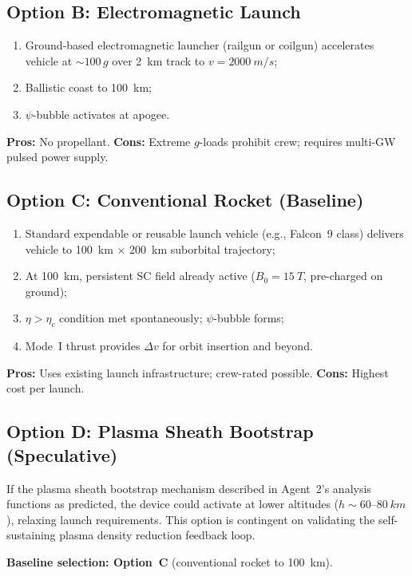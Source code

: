 \documentclass[11pt,a4paper]{article}
\begin{document}
\subsection{Option B: Electromagnetic Launch}

\begin{enumerate}[nosep]
\item Ground-based electromagnetic launcher (railgun or coilgun) accelerates
vehicle at $\sim\!100\,g$ over \SI{2}{km} track to $v = \SI{2000}{m/s}$;
\item Ballistic coast to \SI{100}{km};
\item $\psi$-bubble activates at apogee.
\end{enumerate}
\textbf{Pros:} No propellant. \textbf{Cons:} Extreme $g$-loads prohibit
crew; requires multi-GW pulsed power supply.

\subsection{Option C: Conventional Rocket (Baseline)}

\begin{enumerate}[nosep]
\item Standard expendable or reusable launch vehicle (e.g., Falcon~9 class)
delivers vehicle to \SI{100}{km} $\times$ \SI{200}{km} suborbital trajectory;
\item At \SI{100}{km}, persistent SC field already active ($B_0 = \SI{15}{T}$,
pre-charged on ground);
\item $\eta > \eta_c$ condition met spontaneously; $\psi$-bubble forms;
\item Mode~I thrust provides $\Delta v$ for orbit insertion and beyond.
\end{enumerate}
\textbf{Pros:} Uses existing launch infrastructure; crew-rated possible.
\textbf{Cons:} Highest cost per launch.

\subsection{Option D: Plasma Sheath Bootstrap (Speculative)}

If the plasma sheath bootstrap mechanism described in Agent~2's analysis
functions as predicted, the device could activate at lower altitudes
($h \sim \SI{60}$--$\SI{80}{km}$), relaxing launch requirements. This
option is contingent on validating the self-sustaining plasma density
reduction feedback loop.

\textbf{Baseline selection: Option~C} (conventional rocket to \SI{100}{km}).
\end{document}
